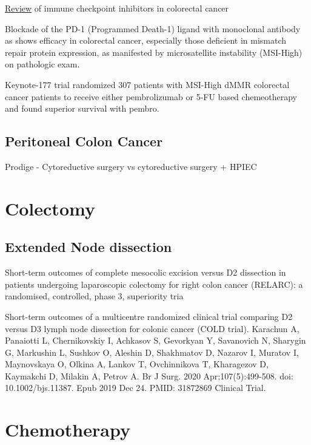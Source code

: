 \documentclass[
]{book}
\begin{document}
\href{https://www.frontiersin.org/articles/10.3389/fimmu.2022.795972/full}{Review} of immune checkpoint inhibitors in colorectal cancer

Blockade of the PD-1 (Programmed Death-1) ligand with monoclonal antibody as shows efficacy in colorectal cancer, especially those deficient in mismatch repair protein expression, as manifested by microsatellite instability (MSI-High) on pathologic exam.

Keynote-177 trial \citep{andre2207} randomized 307 patients with MSI-High dMMR colorectal cancer patients to receive either pembrolizumab or 5-FU based chemeotherapy and found superior survival with pembro.

\hypertarget{peritoneal-colon-cancer}{%
\section{Peritoneal Colon Cancer}\label{peritoneal-colon-cancer}}

Prodige - Cytoreductive surgery vs cytoreductive surgery + HPIEC

\hypertarget{colectomy-1}{%
\chapter{Colectomy}\label{colectomy-1}}

\hypertarget{extended-node-dissection}{%
\section{Extended Node dissection}\label{extended-node-dissection}}

Short-term outcomes of complete mesocolic excision versus D2 dissection in patients undergoing laparoscopic colectomy for right colon cancer (RELARC): a randomised, controlled, phase 3, superiority tria

Short-term outcomes of a multicentre randomized clinical trial comparing D2 versus D3 lymph node dissection for colonic cancer (COLD trial).
Karachun A, Panaiotti L, Chernikovskiy I, Achkasov S, Gevorkyan Y, Savanovich N, Sharygin G, Markushin L, Sushkov O, Aleshin D, Shakhmatov D, Nazarov I, Muratov I, Maynovskaya O, Olkina A, Lankov T, Ovchinnikova T, Kharagezov D, Kaymakchi D, Milakin A, Petrov A.
Br J Surg. 2020 Apr;107(5):499-508. doi: 10.1002/bjs.11387. Epub 2019 Dec 24.
PMID: 31872869 Clinical Trial.

\hypertarget{chemotherapy}{%
\chapter{Chemotherapy}\label{chemotherapy}}
\end{document}
